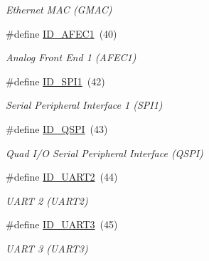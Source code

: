 \begin{DoxyCompactItemize}
\begin{DoxyCompactList}\small\item\em Ethernet M\+AC (G\+M\+AC) \end{DoxyCompactList}\item 
\mbox{\label{group__SAME70J19__id_gaf3a9a3a4480b70f4f9f3f52f6a49e5d2}} 
\#define \mbox{\hyperlink{group__SAME70J19__id_gaf3a9a3a4480b70f4f9f3f52f6a49e5d2}{I\+D\+\_\+\+A\+F\+E\+C1}}~(40)
\begin{DoxyCompactList}\small\item\em Analog Front End 1 (A\+F\+E\+C1) \end{DoxyCompactList}\item 
\mbox{\label{group__SAME70J19__id_ga5a2e708a2e4b2aab061a93b025092e93}} 
\#define \mbox{\hyperlink{group__SAME70J19__id_ga5a2e708a2e4b2aab061a93b025092e93}{I\+D\+\_\+\+S\+P\+I1}}~(42)
\begin{DoxyCompactList}\small\item\em Serial Peripheral Interface 1 (S\+P\+I1) \end{DoxyCompactList}\item 
\mbox{\label{group__SAME70J19__id_gab477663367b3c77e5b1c50b4117d6ae0}} 
\#define \mbox{\hyperlink{group__SAME70J19__id_gab477663367b3c77e5b1c50b4117d6ae0}{I\+D\+\_\+\+Q\+S\+PI}}~(43)
\begin{DoxyCompactList}\small\item\em Quad I/O Serial Peripheral Interface (Q\+S\+PI) \end{DoxyCompactList}\item 
\mbox{\label{group__SAME70J19__id_gae483016c3dc0f4ce9953e51d85d4eabb}} 
\#define \mbox{\hyperlink{group__SAME70J19__id_gae483016c3dc0f4ce9953e51d85d4eabb}{I\+D\+\_\+\+U\+A\+R\+T2}}~(44)
\begin{DoxyCompactList}\small\item\em U\+A\+RT 2 (U\+A\+R\+T2) \end{DoxyCompactList}\item 
\mbox{\label{group__SAME70J19__id_gac628e48b2e762d2fb07b85d92298e89b}} 
\#define \mbox{\hyperlink{group__SAME70J19__id_gac628e48b2e762d2fb07b85d92298e89b}{I\+D\+\_\+\+U\+A\+R\+T3}}~(45)
\begin{DoxyCompactList}\small\item\em U\+A\+RT 3 (U\+A\+R\+T3) \end{DoxyCompactList}\item 

\end{DoxyCompactItemize}
